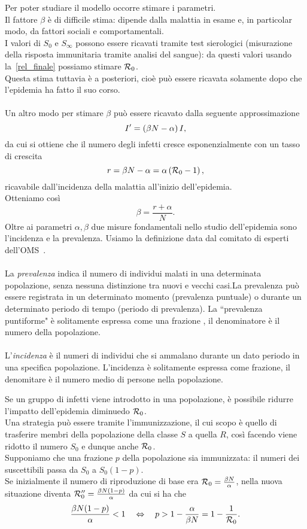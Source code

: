 Per poter studiare il modello occorre stimare i parametri.\\ Il fattore $\beta$ \`e di difficile stima: dipende dalla malattia in esame e,  in particolar modo, da fattori sociali e comportamentali.\\
I valori di $S_0$ e $S_\infty$ possono essere ricavati tramite test sierologici (misurazione della risposta immunitaria tramite analisi del sangue): da questi valori usando la~\eqref{rel_finale} possiamo stimare $\mathcal R_0$.\\
Questa stima tuttavia \`e a posteriori, cio\`e pu\`o essere ricavata solamente dopo che l'epidemia ha fatto il suo corso.\\ \\
Un altro modo per stimare $\beta$ pu\`o essere ricavato dalla seguente approssimazione
$$ I' = \left(  \beta N -\alpha  \right) I,$$ 
da cui si ottiene che il numero degli infetti cresce esponenzialmente con un tasso di crescita 
$$ r =\beta N - \alpha = \alpha \left(  \mathcal R_0 -1 \right),$$
ricavabile dall'incidenza della malattia  all'inizio dell'epidemia.\\Otteniamo cos\`i 
$$ \beta = \frac{r + \alpha } {N}.$$
Oltre ai parametri $\alpha,\beta$ due misure fondamentali nello studio dell'epidemia sono l'incidenza e la prevalenza. Usiamo la definizione data dal comitato di esperti dell'OMS~\cite{world1959expert}.\\ \\ 
La \textit{prevalenza} indica il numero di individui malati in una determinata popolazione, senza nessuna distinzione tra nuovi e vecchi casi.La prevalenza può essere registrata in un determinato momento (prevalenza puntuale) o durante un determinato periodo di tempo (periodo di prevalenza). La ``prevalenza puntiforme"  è solitamente espressa come una frazione , il denominatore è il numero della popolazione.\\ \\
L'\textit{incidenza} \`e il numeri di  individui che si ammalano durante un dato periodo in una specifica popolazione. L'incidenza \`e solitamente espressa come frazione, il denomitare \`e il numero medio di persone nella popolazione.
\newpage

\begin{oss}[Immunizzazione]
Se un gruppo di infetti viene introdotto in una popolazione,  \`e possibile ridurre l'impatto dell'epidemia diminuedo $\mathcal R_0$.\\
Una strategia pu\`o essere tramite l'immunizzazione, il cui scopo \`e quello di trasferire membri della popolazione della classe $S$ a quella $R$, cos\`i facendo viene ridotto il numero $S_0$ e dunque anche $\mathcal R_0$.\\
Supponiamo che una frazione $p$ della popolazione sia  immunizzata: il numeri dei suscettibili passa da $S_0$ a $S_0(1-p)$.\\
Se inizialmente il numero di riproduzione di base era $\mathcal R_0 = \frac{\beta N}{\alpha}$, nella nuova situazione diventa $\mathcal R_0''=\frac{\beta N(1-p)}{\alpha}$  da cui si ha che  
$$\frac{\beta N(1-p)}{\alpha}< 1\quad \Leftrightarrow \quad p> 1-\frac{\alpha}{\beta N} = 1 -\frac{1}{\mathcal R_0}.
$$
\end{oss}
\newpage
